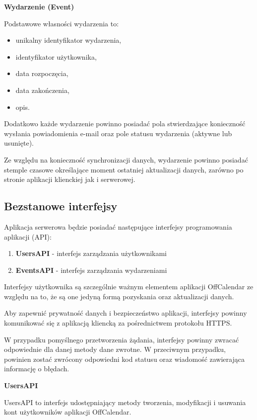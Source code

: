 \textbf{Wydarzenie (Event)}

Podstawowe własności wydarzenia to:

\begin{itemize}
\item unikalny identyfikator wydarzenia,
\item identyfikator użytkownika,
\item data rozpoczęcia,
\item data zakończenia,
\item opis.
\end{itemize}

Dodatkowo każde wydarzenie powinno posiadać pola stwierdzające konieczność wysłania powiadomienia e-mail oraz pole statusu wydarzenia (aktywne lub usunięte). 

Ze względu na konieczność synchronizacji danych, wydarzenie powinno posiadać stemple czasowe określające moment ostatniej aktualizacji danych, zarówno po stronie aplikacji klienckiej jak i serwerowej.

\subsection{Bezstanowe interfejsy}
\label{bezstanoweInter}

Aplikacja serwerowa będzie posiadać następujące interfejsy programowania aplikacji (API):

\begin{enumerate}
\item \textbf{UsersAPI} - interfejs zarządzania użytkownikami
\item \textbf{EventsAPI} - interfejs zarządzania wydarzeniami
\end{enumerate}

Interfejsy użytkownika są szczególnie ważnym elementem aplikacji OffCalendar ze względu na to, że są one jedyną formą pozyskania oraz aktualizacji danych. 

Aby zapewnić prywatność danych i bezpieczeństwo aplikacji, interfejsy powinny komunikować się z aplikacją kliencką za pośrednictwem protokołu HTTPS\cite{https}.

W przypadku pomyślnego przetworzenia żądania, interfejsy powinny zwracać odpowiednie dla danej metody dane zwrotne. W przeciwnym przypadku, powinien zostać zwrócony odpowiedni kod statusu oraz wiadomość zawierająca informację o błędach.

\textbf{UsersAPI}

UsersAPI to interfejs udostępniający metody tworzenia, modyfikacji i usuwania kont użytkowników aplikacji OffCalendar.

